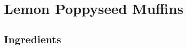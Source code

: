 \thispagestyle{fancy}
\section{Lemon Poppyseed Muffins}
\AddToShipoutPicture*{\LemonPoppyseed}

\subsection*{Ingredients}